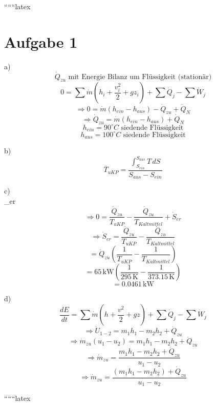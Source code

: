 
``````latex

\section*{Aufgabe 1}

a) \\
\[
\dot{Q}_{zu} \text{ mit Energie Bilanz um Flüssigkeit (stationär)}
\]
\[
0 = \sum \dot{m} \left( h_i + \frac{v_i^2}{2} + g z_i \right) + \sum \dot{Q}_j - \sum \dot{W}_j
\]
\[
\Rightarrow 0 = \dot{m} (h_{ein} - h_{aus}) - \dot{Q}_{zu} + \dot{Q}_N
\]
\[
\Rightarrow \dot{Q}_{zu} = \dot{m} (h_{ein} - h_{aus}) + \dot{Q}_N
\]
\[
h_{ein} = 90^\circ C \text{ siedende Flüssigkeit}
\]
\[
h_{aus} = 100^\circ C \text{ siedende Flüssigkeit}
\]

b) \\
\[
\overline{T}_{uKP} = \frac{\int_{S_{ein}}^{S_{aus}} T \, dS}{S_{aus} - S_{ein}}
\]

c) \\
 \quad {}_{er}
\]
\]
\[
\Rightarrow 0 = \frac{\dot{Q}_{zu}}{T_{uKP}} - \frac{\dot{Q}_{zu}}{T_{Kaltmittel}} + \dot{S}_{er}
\]
\[
\Rightarrow \dot{S}_{er} = \frac{\dot{Q}_{zu}}{T_{uKP}} - \frac{\dot{Q}_{zu}}{T_{Kaltmittel}}
\]
\[
= \dot{Q}_{zu} \left( \frac{1}{T_{uKP}} - \frac{1}{T_{Kaltmittel}} \right)
\]
\[
= 65 \, \text{kW} \left( \frac{1}{295 \, \text{K}} - \frac{1}{373.15 \, \text{K}} \right)
\]
\[
= 0.0461 \, \text{kW}
\]

d) \\
  
\]
\[
\frac{dE}{dt} = \sum \dot{m} \left( h + \frac{v^2}{2} + gz \right) + \sum \dot{Q}_j - \sum \dot{W}_j
\]
\[
\Rightarrow \dot{U}_{1-2} = m_1 h_1 - m_2 h_2 + \dot{Q}_{zu}
\]
\[
\Rightarrow \dot{m}_{zu} (u_1 - u_2) = m_1 h_1 - m_2 h_2 + \dot{Q}_{zu}
\]
\[
\Rightarrow \dot{m}_{zu} = \frac{m_1 h_1 - m_2 h_2 + \dot{Q}_{zu}}{u_1 - u_2}
\]
\[
\Rightarrow \dot{m}_{zu} = \frac{(m_1 h_1 - m_2 h_2) + \dot{Q}_{zu}}{u_1 - u_2}
\]

``````latex


